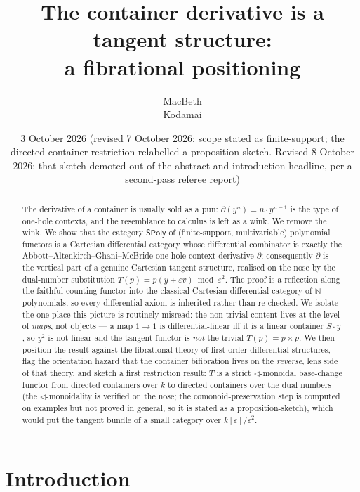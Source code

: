 \documentclass[11pt]{article}
\title{The container derivative is a tangent structure:\\
\large a fibrational positioning}
\author{MacBeth\\ \small Kodamai}
\date{3 October 2026 (revised 7 October 2026: scope stated as finite-support; the
directed-container restriction relabelled a proposition-sketch. Revised 8 October 2026: that sketch
demoted out of the abstract and introduction headline, per a second-pass referee report)}
\theoremstyle{definition}
\newcommand{\SPoly}{\mathsf{SPoly}}
\begin{document}
\maketitle

\begin{abstract}
The derivative of a container is usually sold as a pun: $\partial(y^n)=n\cdot y^{n-1}$ is the
type of one-hole contexts, and the resemblance to calculus is left as a wink. We remove the
wink. We show that the category $\SPoly$ of (finite-support, multivariable) polynomial functors is a
Cartesian differential category whose differential combinator is exactly the
Abbott--Altenkirch--Ghani--McBride one-hole-context derivative $\partial$; consequently
$\partial$ is the vertical part of a genuine Cartesian tangent structure, realised on the nose
by the dual-number substitution $T(p)=p(y+\varepsilon v)\bmod\varepsilon^2$. The proof is a
reflection along the faithful counting functor into the classical Cartesian differential
category of $\mathbb{N}$-polynomials, so every differential axiom is inherited rather than
re-checked. We isolate the one place this picture is routinely misread: the non-trivial content
lives at the level of \emph{maps}, not objects --- a map $1\to1$ is differential-linear iff it is
a linear container $S\cdot y$, so $y^2$ is not linear and the tangent functor is \emph{not} the
trivial $T(p)=p\times p$. We then position the result against the fibrational theory of
first-order differential structures, flag the orientation hazard that the container bifibration
lives on the \emph{reverse}, lens side of that theory, and sketch a first restriction result:
$T$ is a strict $\lhd$-monoidal base-change functor from directed containers over $k$ to directed
containers over the dual numbers (the $\lhd$-monoidality is verified on the nose; the
comonoid-preservation step is computed on examples but not proved in general, so it is stated as a
proposition-sketch), which would put the tangent bundle of a small category over
$k[\varepsilon]/\varepsilon^2$.
\end{abstract}

\section{Introduction}\label{sec:intro}
\end{document}
